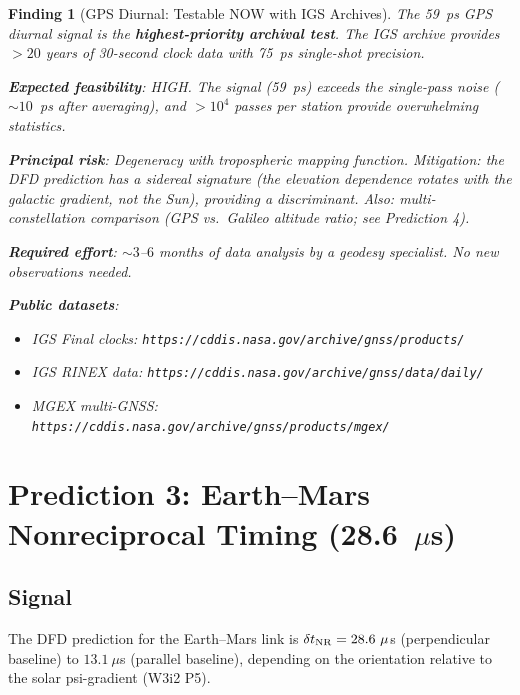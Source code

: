 \documentclass[11pt]{article}
\newtheorem{finding}{Finding}
\begin{document}
\begin{finding}[GPS Diurnal: Testable NOW with IGS Archives]
\label{find:GPS-archival}
The 59~ps GPS diurnal signal is the \textbf{highest-priority archival
test}. The IGS archive provides $> 20$ years of 30-second clock data
with 75~ps single-shot precision.

\textbf{Expected feasibility}: HIGH. The signal (59~ps) exceeds the
single-pass noise ($\sim 10$~ps after averaging), and $> 10^4$ passes
per station provide overwhelming statistics.

\textbf{Principal risk}: Degeneracy with tropospheric mapping function.
Mitigation: the DFD prediction has a \emph{sidereal} signature (the
elevation dependence rotates with the galactic gradient, not the Sun),
providing a discriminant. Also: multi-constellation comparison
(GPS vs.\ Galileo altitude ratio; see Prediction 4).

\textbf{Required effort}: $\sim 3$--$6$ months of data analysis by a
geodesy specialist. No new observations needed.

\textbf{Public datasets}:
\begin{itemize}[nosep]
\item IGS Final clocks: \texttt{https://cddis.nasa.gov/archive/gnss/products/}
\item IGS RINEX data: \texttt{https://cddis.nasa.gov/archive/gnss/data/daily/}
\item MGEX multi-GNSS: \texttt{https://cddis.nasa.gov/archive/gnss/products/mgex/}
\end{itemize}
\end{finding}

\section{Prediction 3: Earth--Mars Nonreciprocal Timing (28.6~$\mu$s)}
\label{sec:archival-Mars}

\subsection{Signal}

The DFD prediction for the Earth--Mars link is $\delta t_{\rm NR}
= 28.6~\mu$s (perpendicular baseline) to $13.1~\mu$s (parallel
baseline), depending on the orientation relative to the solar
psi-gradient (W3i2 P5).
\end{document}
